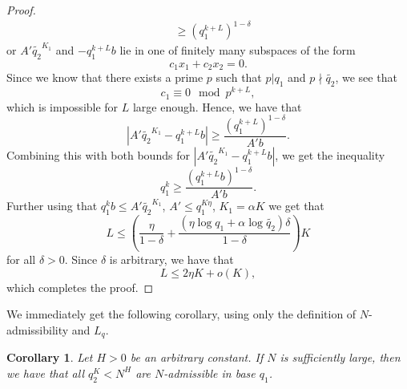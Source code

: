 \documentclass[12pt]{amsart}
\renewcommand{\leq}{\leqslant}
\renewcommand{\geq}{\geqslant}
\newtheorem{corollary}[theorem]{Corollary}
\theoremstyle{definition}
\numberwithin{equation}{section}
\numberwithin{equation}{section}
\begin{document}
\begin{proof}
\begin{align*}
        &\geq \left(q_1^{k+L}\right)^{1-\delta}
	\end{align*}
	or $A'\tilde{q_{2}}^{K_1}$ and $-q_1^{k+L}b$ lie in one of finitely many subspaces of the form
	\[
		c_1x_1+c_2x_2 = 0.
	\]
	Since we know that there exists a prime $p$ such that $p| q_1$ and $p\nmid \tilde{q_{2}}$, we see that
	\[
		c_1 \equiv 0 \mod p^{k+L},
	\]
	which is impossible for $L$ large enough.
	Hence, we have that 
	\[
		\left| A'\tilde{q_{2}}^{K_1}-q_1^{k+L}b\right| \geq	\frac{\left(q_1^{k+L}\right)^{1-\delta}}{A'b}.
	\]
	Combining this with both bounds for $\left|A'\tilde{q_{2}}^{K_1}-q_1^{k+L}b\right|$, we get the inequality
	\[
		q_1^k\geq \frac{\left(q_1^{k+L}b\right)^{1-\delta}}{A'b}.
	\]
	Further using that $q_1^kb\leq A'\tilde{q_{2}}^{K_1}$, $A'\leq q_1^{K\eta}$, $K_1=\alpha K$ we get that
	\[
		L \leq \left(\frac{\eta}{1-\delta}+\frac{\left(\eta\log q_1 + \alpha\log \tilde{q_{2}}\right)\delta}{1-\delta}\right)K
	\]
	for all $\delta>0$. Since $\delta$ is arbitrary, we have that
	\[
		L \leq 2\eta K + o(K),
	\]
	which completes the proof.
\end{proof}
We immediately get the following corollary, using only the definition of $N$-admissibility and $L_{q}$.
\begin{corollary}\label{cor_powers_admissible}
	Let $H>0$ be an arbitrary constant. If $N$ is sufficiently large, then we have that all $q_2^K<N^H$ are $N$-admissible in base $q_1$.
\end{corollary}
\end{document}
